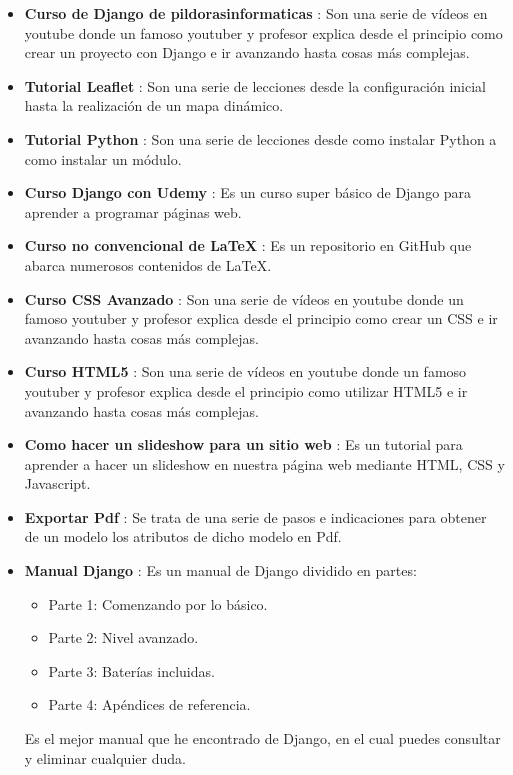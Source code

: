 \begin{itemize}
	\item \textbf{Curso de Django de pildorasinformaticas} \cite{djangoPildoras}: Son una serie de vídeos en youtube donde un famoso youtuber y profesor explica desde el principio como crear un proyecto con Django e ir avanzando hasta cosas más complejas.
	\item \textbf{Tutorial Leaflet} \cite{tutorialLeaflet}: Son una serie de lecciones desde la configuración inicial hasta la realización de un mapa dinámico. 
	\item \textbf{Tutorial Python} \cite{tutorialPython}: Son una serie de lecciones desde como instalar Python a como instalar un módulo. 
	\item \textbf{Curso Django con Udemy} \cite{udemy}: Es un curso super básico de Django para aprender a programar páginas web.
	\item \textbf{Curso no convencional de LaTeX} \cite{cursoLatex}: Es un repositorio en GitHub que abarca numerosos contenidos de LaTeX. 
	\item \textbf{Curso CSS Avanzado} \cite{cursoCss}: Son una serie de vídeos en youtube donde un famoso youtuber y profesor explica desde el principio como crear un CSS e ir avanzando hasta cosas más complejas.
	\item \textbf{Curso HTML5} \cite{cursoHTML}: Son una serie de vídeos en youtube donde un famoso youtuber y profesor explica desde el principio como utilizar HTML5 e ir avanzando hasta cosas más complejas.
	\item \textbf{Como hacer un slideshow para un sitio web} \cite{slideshow}: Es un tutorial para aprender a hacer un slideshow en nuestra página web mediante HTML, CSS y Javascript.
	\item \textbf{Exportar Pdf} \cite{exportarPdf}: Se trata de una serie de pasos e indicaciones para obtener de un modelo los atributos de dicho modelo en Pdf.
	\item \textbf{Manual Django} \cite{manualDjango}: Es un manual de Django dividido en partes:
	\begin{itemize} 
		\item Parte 1: Comenzando por lo básico.
		\item Parte 2: Nivel avanzado.
		\item Parte 3: Baterías incluidas.
		\item Parte 4: Apéndices de referencia.
	\end{itemize}
	Es el mejor manual que he encontrado de Django, en el cual puedes consultar y eliminar cualquier duda.
\end{itemize}
